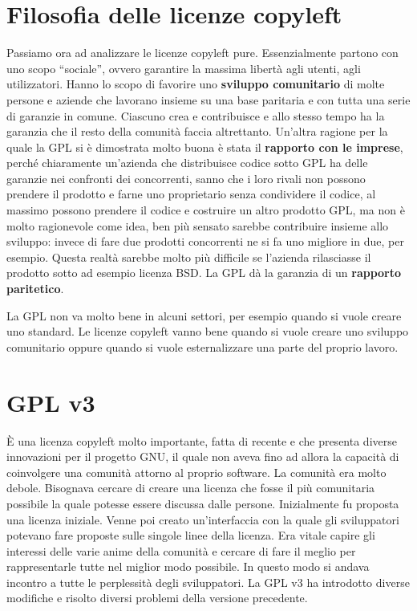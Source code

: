 \section{Filosofia delle licenze copyleft}

Passiamo ora ad analizzare le licenze copyleft pure. Essenzialmente partono con uno scopo ``sociale'', ovvero garantire la massima libertà agli utenti, agli utilizzatori. Hanno lo scopo di favorire uno \textbf{sviluppo comunitario} di molte persone e aziende che lavorano insieme su una base paritaria e con tutta una serie di garanzie in comune. Ciascuno crea e contribuisce e allo stesso tempo ha la garanzia che il resto della comunità faccia altrettanto. Un'altra ragione per la quale la GPL si è dimostrata molto buona è stata il \textbf{rapporto con le imprese}, perché chiaramente un'azienda che distribuisce codice sotto GPL ha delle garanzie nei confronti dei concorrenti, sanno che i loro rivali non possono prendere il prodotto e farne uno proprietario senza condividere il codice, al massimo possono prendere il codice e costruire un altro prodotto GPL, ma non è molto ragionevole come idea, ben più sensato sarebbe contribuire insieme allo sviluppo: invece di fare due prodotti concorrenti ne si fa uno migliore in due, per esempio. Questa realtà sarebbe molto più difficile se l'azienda rilasciasse il prodotto sotto ad esempio licenza BSD. La GPL dà la garanzia di un \textbf{rapporto paritetico}. 

La GPL non va molto bene in alcuni settori, per esempio quando si vuole creare uno standard. Le licenze copyleft vanno bene quando si vuole creare uno sviluppo comunitario oppure quando si vuole esternalizzare una parte del proprio lavoro. 

\section{GPL v3}

È una licenza copyleft molto importante, fatta di recente e che presenta diverse innovazioni per il progetto GNU, il quale non aveva fino ad allora la capacità di coinvolgere una comunità attorno al proprio software. La comunità era molto debole. Bisognava cercare di creare una licenza che fosse il più comunitaria possibile la quale potesse essere discussa dalle persone. Inizialmente fu proposta una licenza iniziale. Venne poi creato un'interfaccia con la quale gli sviluppatori potevano fare proposte sulle singole linee della licenza. Era vitale capire gli interessi delle varie anime della comunità e cercare di fare il meglio per rappresentarle tutte nel miglior modo possibile. In questo modo si andava incontro a tutte le perplessità degli sviluppatori. La GPL v3 ha introdotto diverse modifiche e risolto diversi problemi della versione precedente. 

